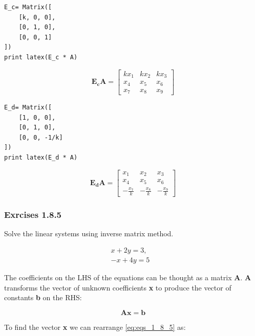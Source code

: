 \begin{verbatim}
E_c= Matrix([
    [k, 0, 0],
    [0, 1, 0],
    [0, 0, 1]
])
print latex(E_c * A)
\end{verbatim}

\begin{equation}
\mathbf{E_cA} = \left[\begin{matrix}k x_{1} & k x_{2} & k x_{3}\\x_{4} & x_{5} & x_{6}\\x_{7} & x_{8} & x_{9}\end{matrix}\right]
\end{equation}


\begin{verbatim}
E_d= Matrix([
    [1, 0, 0],
    [0, 1, 0],
    [0, 0, -1/k]
])
print latex(E_d * A)
\end{verbatim}

\begin{equation}
\mathbf{E_dA} = \left[\begin{matrix}x_{1} & x_{2} & x_{3}\\x_{4} & x_{5} & x_{6}\\- \frac{x_{7}}{k} & - \frac{x_{8}}{k} & - \frac{x_{9}}{k}\end{matrix}\right]
\end{equation}

\subsubsection{Exrcises 1.8.5}

Solve the linear systems using inverse matrix method.

\begin{equation}\label{eq:eqs_1_8_5}
\begin{matrix}x + 2 y = 3, & \\ - x + 4 y = 5\end{matrix}
\end{equation}

The coefficients on the LHS of the equations can be thought as a matrix
\textbf{A}. \textbf{A} transforms the vector of unknown coefficients \textbf{x}
to produce the vector of constants \textbf{b} on the RHS:

\begin{equation}\label{eq:1_8_5}
\mathbf{A}\mathbf{x} = \mathbf{b}
\end{equation}

To find the vector \textbf{x} we can rearrange \ref{eq:eqs_1_8_5} as:

